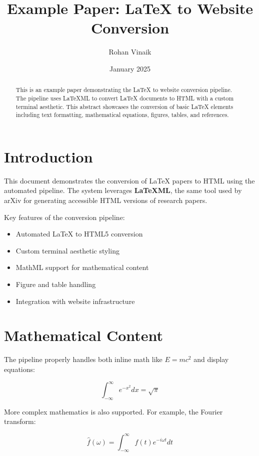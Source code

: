 \documentclass{article}
\title{Example Paper: LaTeX to Website Conversion}
\author{Rohan Vinaik}
\date{January 2025}
\begin{document}
\maketitle

\begin{abstract}
This is an example paper demonstrating the LaTeX to website conversion pipeline. The pipeline uses LaTeXML to convert LaTeX documents to HTML with a custom terminal aesthetic. This abstract showcases the conversion of basic LaTeX elements including text formatting, mathematical equations, figures, tables, and references.
\end{abstract}

\section{Introduction}

This document demonstrates the conversion of LaTeX papers to HTML using the automated pipeline. The system leverages \textbf{LaTeXML}, the same tool used by arXiv for generating accessible HTML versions of research papers.

Key features of the conversion pipeline:
\begin{itemize}
    \item Automated LaTeX to HTML5 conversion
    \item Custom terminal aesthetic styling
    \item MathML support for mathematical content
    \item Figure and table handling
    \item Integration with website infrastructure
\end{itemize}

\section{Mathematical Content}

The pipeline properly handles both inline math like $E = mc^2$ and display equations:

\begin{equation}
\int_{-\infty}^{\infty} e^{-x^2} dx = \sqrt{\pi}
\label{eq:gaussian}
\end{equation}

More complex mathematics is also supported. For example, the Fourier transform:

\begin{equation}
\hat{f}(\omega) = \int_{-\infty}^{\infty} f(t) e^{-i\omega t} dt
\end{equation}
\end{document}
